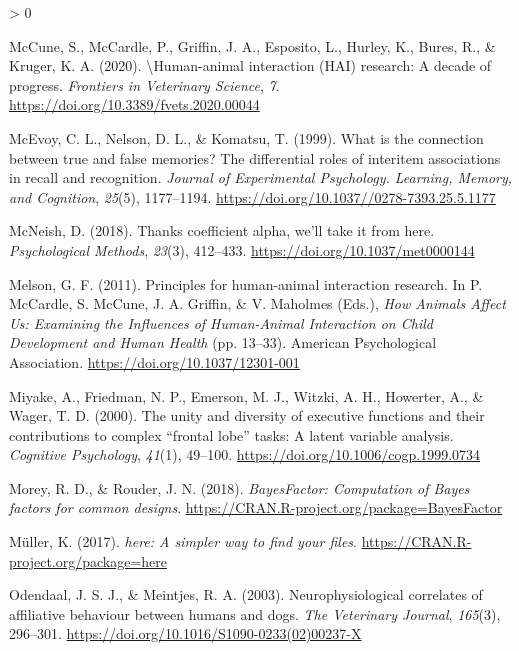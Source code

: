 \documentclass[
  english,
  pub,floatsintext]{apa6}
\newlength{\cslhangindent}
\newenvironment{CSLReferences}[2] %
 {%
  \setlength{\parindent}{0pt}
  \ifodd #1 \everypar{\setlength{\hangindent}{\cslhangindent}}\ignorespaces\fi
  \ifnum #2 > 0
  \setlength{\parskip}{#2\baselineskip}
  \fi
 }%
 {}
\begin{document}
\begin{CSLReferences}{1}{0}
\leavevmode\hypertarget{ref-McCune.etal.2020}{}%
McCune, S., McCardle, P., Griffin, J. A., Esposito, L., Hurley, K., Bures, R., \& Kruger, K. A. (2020). \textbackslash{}{Human}-animal interaction ({HAI}) research: {A} decade of progress. \emph{Frontiers in Veterinary Science}, \emph{7}. \url{https://doi.org/10.3389/fvets.2020.00044}

\leavevmode\hypertarget{ref-McEvoy.etal.1999}{}%
McEvoy, C. L., Nelson, D. L., \& Komatsu, T. (1999). What is the connection between true and false memories? {The} differential roles of interitem associations in recall and recognition. \emph{Journal of Experimental Psychology. Learning, Memory, and Cognition}, \emph{25}(5), 1177--1194. \url{https://doi.org/10.1037//0278-7393.25.5.1177}

\leavevmode\hypertarget{ref-McNeish.2018}{}%
McNeish, D. (2018). Thanks coefficient alpha, we'll take it from here. \emph{Psychological Methods}, \emph{23}(3), 412--433. \url{https://doi.org/10.1037/met0000144}

\leavevmode\hypertarget{ref-Melson.2011}{}%
Melson, G. F. (2011). Principles for human-animal interaction research. In P. McCardle, S. McCune, J. A. Griffin, \& V. Maholmes (Eds.), \emph{How {Animals Affect Us}: {Examining} the {Influences} of {Human}-{Animal Interaction} on {Child Development} and {Human Health}} (pp. 13--33). {American Psychological Association}. \url{https://doi.org/10.1037/12301-001}

\leavevmode\hypertarget{ref-Miyake.etal.2000}{}%
Miyake, A., Friedman, N. P., Emerson, M. J., Witzki, A. H., Howerter, A., \& Wager, T. D. (2000). The unity and diversity of executive functions and their contributions to complex {``frontal lobe''} tasks: A latent variable analysis. \emph{Cognitive Psychology}, \emph{41}(1), 49--100. \url{https://doi.org/10.1006/cogp.1999.0734}

\leavevmode\hypertarget{ref-R-BayesFactor}{}%
Morey, R. D., \& Rouder, J. N. (2018). \emph{BayesFactor: Computation of {Bayes} factors for common designs}. \url{https://CRAN.R-project.org/package=BayesFactor}

\leavevmode\hypertarget{ref-R-here}{}%
Müller, K. (2017). \emph{{here}: A simpler way to find your files}. \url{https://CRAN.R-project.org/package=here}

\leavevmode\hypertarget{ref-Odendaal.Meintjes.2003}{}%
Odendaal, J. S. J., \& Meintjes, R. A. (2003). Neurophysiological correlates of affiliative behaviour between humans and dogs. \emph{The Veterinary Journal}, \emph{165}(3), 296--301. \url{https://doi.org/10.1016/S1090-0233(02)00237-X}


\end{CSLReferences}
\end{document}
